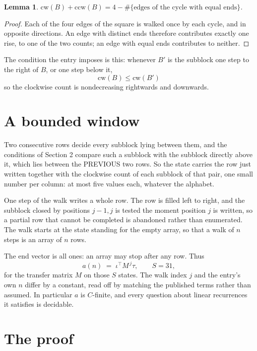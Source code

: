 \documentclass[11pt,a4paper]{article}
\theoremstyle{plain}
\newtheorem{lemma}[theorem]{Lemma}
\theoremstyle{definition}
\begin{document}
\begin{lemma}\label{lem:sum}
$\mathrm{cw}(B)+\mathrm{ccw}(B)=4-\#\{\text{edges of the cycle with equal ends}\}$.
\end{lemma}

\begin{proof}
Each of the four edges of the square is walked once by each cycle, and in opposite directions.
An edge with distinct ends therefore contributes exactly one rise, to one of the two counts;
an edge with equal ends contributes to neither.
\end{proof}

The condition the entry imposes is this: whenever $B'$ is the subblock one step to the right of $B$, or one step below it, 
\[
\mathrm{cw}(B)\le\mathrm{cw}(B')
\]
so the clockwise count is nondecreasing rightwards and downwards.

\section{A bounded window}

Two consecutive rows decide every subblock lying between them, and the conditions of Section 2 compare such a subblock with the subblock directly above it, which lies between the PREVIOUS two rows. So the state carries the row just written together with the clockwise count of each subblock of that pair, one small number per column: at most five values each, whatever the alphabet.

One step of the walk writes a whole row. The row is filled left to right, and the subblock
closed by positions $j-1,j$ is tested the moment position $j$ is written, so a partial row that
cannot be completed is abandoned rather than enumerated. The walk starts at the state standing
for the empty array, so that a walk of $n$ steps is an array of $n$ rows.

The end vector is all ones: an array may stop after any row. Thus
\[
a(n)\;=\;\iota^{\!\top}M^{\,j}\tau ,\qquad S=31,
\]
for the transfer matrix $M$ on those $S$ states. The walk index $j$ and the entry's own $n$
differ by a constant, read off by matching the published terms rather than assumed. In
particular $a$ is $C$-finite, and every question about linear recurrences it satisfies is
decidable.

\section{The proof}
\end{document}
